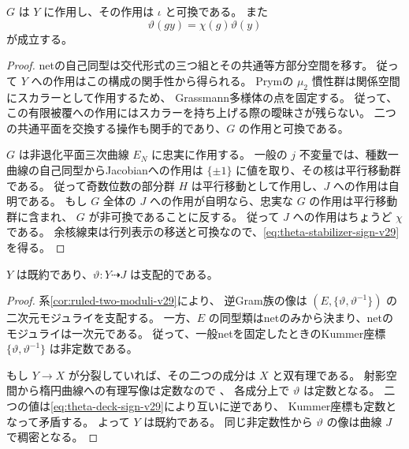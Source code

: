 \begin{lemma}[安定化群の符号と被覆の持上げ]
\label{lem:theta-stabilizer-sign-v29}
$G$ は $Y$ に作用し、その作用は $\iota$ と可換である。
また
\begin{equation}
 \vartheta(gy)=\chi(g)\vartheta(y)
 \label{eq:theta-stabilizer-sign-v29}
\end{equation}
が成立する。
\end{lemma}

\begin{proof}
netの自己同型は交代形式の三つ組とその共通等方部分空間を移す。
従って $Y$ への作用はこの構成の関手性から得られる。
Prymの $\mu_2$ 慣性群は関係空間にスカラーとして作用するため、
Grassmann多様体の点を固定する。
従って、この有限被覆への作用にはスカラーを持ち上げる際の曖昧さが残らない。
二つの共通平面を交換する操作も関手的であり、$G$ の作用と可換である。

$G$ は非退化平面三次曲線 $E_N$ に忠実に作用する。
一般の $j$ 不変量では、種数一曲線の自己同型からJacobianへの作用は
$\{\pm1\}$ に値を取り、その核は平行移動群である。
従って奇数位数の部分群 $H$ は平行移動として作用し、$J$ への作用は自明である。
もし $G$ 全体の $J$ への作用が自明なら、忠実な $G$ の作用は平行移動群に含まれ、
$G$ が非可換であることに反する。
従って $J$ への作用はちょうど $\chi$ である。
余核線束は行列表示の移送と可換なので、\eqref{eq:theta-stabilizer-sign-v29}を得る。
\end{proof}

\begin{lemma}[生の順序付け被覆の既約性]
\label{lem:raw-order-cover-integral-v29}
$Y$ は既約であり、$\vartheta:Y\dashrightarrow J$ は支配的である。
\end{lemma}

\begin{proof}
系\ref{cor:ruled-two-moduli-v29}により、
逆Gram族の像は $(E,\{\vartheta,\vartheta^{-1}\})$ の二次元モジュライを支配する。
一方、$E$ の同型類はnetのみから決まり、netのモジュライは一次元である。
従って、一般netを固定したときのKummer座標
$\{\vartheta,\vartheta^{-1}\}$ は非定数である。

もし $Y\to X$ が分裂していれば、その二つの成分は $X$ と双有理である。
射影空間から楕円曲線への有理写像は定数なので
\cite[I, Proposition~3.10]{MilneAbelianVarieties2008}、
各成分上で $\vartheta$ は定数となる。
二つの値は\eqref{eq:theta-deck-sign-v29}により互いに逆であり、
Kummer座標も定数となって矛盾する。
よって $Y$ は既約である。
同じ非定数性から $\vartheta$ の像は曲線 $J$ で稠密となる。
\end{proof}

